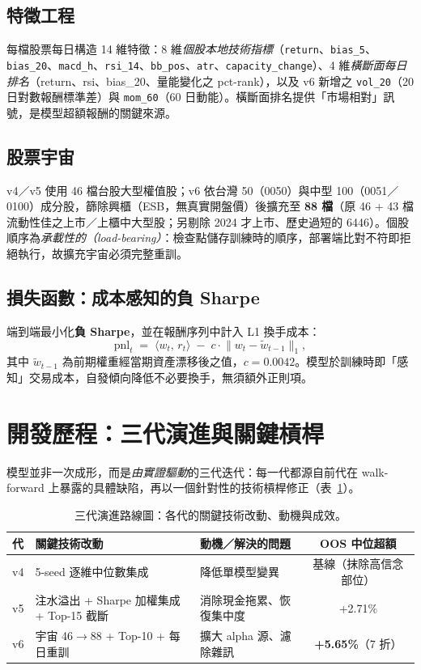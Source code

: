 \documentclass[11pt, fontset=none]{ctexart}
\begin{document}
\subsection{特徵工程}
每檔股票每日構造 14 維特徵：8 維\emph{個股本地技術指標}（\texttt{return}、\texttt{bias\_5}、\texttt{bias\_20}、\texttt{macd\_h}、\texttt{rsi\_14}、\texttt{bb\_pos}、\texttt{atr}、\texttt{capacity\_change}）、4 維\emph{橫斷面每日排名}（return、rsi、bias\_20、量能變化之 pct-rank），以及 v6 新增之 \texttt{vol\_20}（20 日對數報酬標準差）與 \texttt{mom\_60}（60 日動能）。橫斷面排名提供「市場相對」訊號，是模型超額報酬的關鍵來源。

\subsection{股票宇宙}
v4／v5 使用 46 檔台股大型權值股；v6 依台灣 50（0050）與中型 100（0051／0100）成分股，篩除興櫃（ESB，無真實開盤價）後擴充至 \textbf{88 檔}（原 46 + 43 檔流動性佳之上市／上櫃中大型股；另剔除 2024 才上市、歷史過短的 6446）。個股順序為\emph{承載性的（load-bearing）}：檢查點儲存訓練時的順序，部署端比對不符即拒絕執行，故擴充宇宙必須完整重訓。

\subsection{損失函數：成本感知的負 Sharpe}
端到端最小化\textbf{負 Sharpe}，並在報酬序列中計入 L1 換手成本：
\[
  \text{pnl}_t \;=\; \langle w_t,\, r_t\rangle \;-\; c\cdot \big\| w_t - \tilde{w}_{t-1}\big\|_1,
\]
其中 $\tilde{w}_{t-1}$ 為前期權重經當期資產漂移後之值，$c=0.0042$。模型於訓練時即「感知」交易成本，自發傾向降低不必要換手，無須額外正則項。

\section{開發歷程：三代演進與關鍵槓桿}

模型並非一次成形，而是\emph{由實證驅動}的三代迭代：每一代都源自前代在 walk-forward 上暴露的具體缺陷，再以一個針對性的技術槓桿修正（表~\ref{tab:evo}）。

\begin{table}[h]
  \centering
  \caption{三代演進路線圖：各代的關鍵技術改動、動機與成效。}
  \label{tab:evo}
  \small
  \begin{tabular}{lll c}
    \toprule
    代  & 關鍵技術改動                          & 動機／解決的問題          & OOS 中位超額 \\
    \midrule
    v4 & 5-seed 逐維中位數集成                  & 降低單模型變異          & 基線（抹除高信念部位） \\
    v5 & 注水溢出 + Sharpe 加權集成 + Top-15 截斷 & 消除現金拖累、恢復集中度     & +2.71\%       \\
    v6 & 宇宙 46$\to$88 + Top-10 + 每日重訓    & 擴大 alpha 源、濾除雜訊  & \textbf{+5.65\%}（7 折） \\
    \bottomrule
  \end{tabular}
\end{table}
\end{document}
